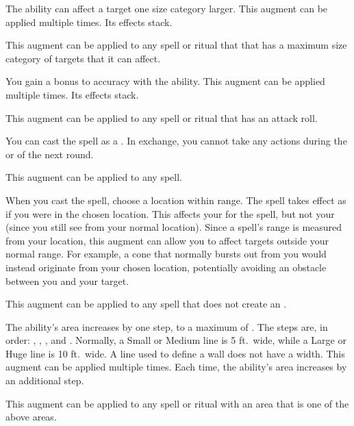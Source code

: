              The ability can affect a target one size category larger.
            This augment can be applied multiple times.
            Its effects stack.
            \par This augment can be applied to any spell or ritual that that has a maximum size category of targets that it can affect.

             You gain a  bonus to accuracy with the ability.
            This augment can be applied multiple times.
            Its effects stack.
            \par This augment can be applied to any spell or ritual that has an attack roll.

             You can cast the spell as a .
            In exchange, you cannot take any actions during the  or  of the next round.
            \par This augment can be applied to any spell.

             When you cast the spell, choose a location within \rngclose range.
            The spell takes effect as if you were in the chosen location.
            This affects your  for the spell, but not your  (since you still see from your normal location).
            Since a spell's range is measured from your location, this augment can allow you to affect targets outside your normal range.
            For example, a cone that normally bursts out from you would instead originate from your chosen location, potentially avoiding an obstacle between you and your target.
            \par This augment can be applied to any spell that does not create an .

             The ability's area increases by one step, to a maximum of \areahuge.
            The steps are, in order: \areasmall, \areamed, \arealarge, and \areahuge.
            Normally, a Small or Medium line is 5 ft.\ wide, while a Large or Huge line is 10 ft.\ wide.
            A line used to define a wall does not have a width.
            This augment can be applied multiple times.
            Each time, the ability's area increases by an additional step.
            \par This augment can be applied to any spell or ritual with an area that is one of the above areas.

